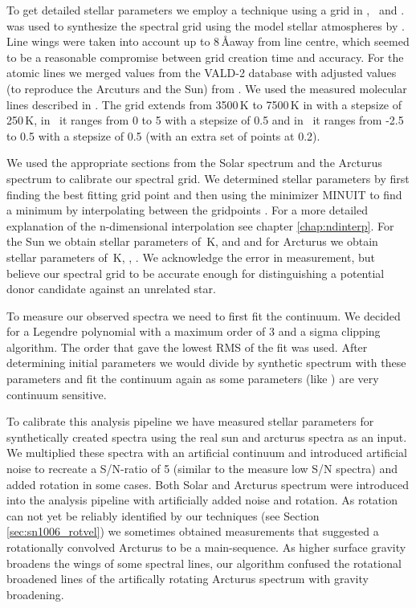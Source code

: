 To get detailed stellar parameters we employ a technique using a grid in \teff, \logg\ and \feh. 
\moog \citep{1973ApJ...184..839S} was used to synthesize the spectral grid using the model stellar atmospheres by \citet{2003IAUS..210P.A20C}. Line wings were taken into account up to 8\,\AA away from line centre, which seemed to be a reasonable compromise between grid creation time and accuracy. For the atomic lines we merged values from the VALD-2 database \citep{2000BaltA...9..590K} with adjusted values (to reproduce the Arcuturs and the Sun) from \cite{2008A&A...486..951G}. We used the measured
molecular lines described in  \citet{1995KurCD..23.....K}. 
The grid extends from 3500\,K to 7500\,K in \teff with a stepsize of 250\,K, in \logg\ it ranges from  0 to 5 with a stepsize of 0.5 and in \feh\ it ranges from -2.5 to 0.5 with a stepsize of 0.5 (with an extra set of points at 0.2). 

We used the appropriate sections from the Solar spectrum \citep{1984sfat.book.....K} and the Arcturus spectrum  \cite{2000vnia.book.....H} to calibrate our spectral grid. We determined stellar parameters by first finding the best fitting grid point and then using the minimizer MINUIT to find a minimum by interpolating between the gridpoints \citep[using][]{Barber96thequickhull}. For a more detailed explanation of the n-dimensional interpolation see chapter \ref{chap:ndinterp}. For the Sun we obtain stellar parameters of \,K,  and  and for Arcturus we obtain stellar parameters of \,K, , . We acknowledge the error in measurement, but believe our spectral grid to be accurate enough for distinguishing a potential donor candidate against an unrelated star. 


To measure our observed spectra we need to first fit the continuum. We decided for a Legendre polynomial with a maximum order of 3 and a sigma clipping algorithm. The order that gave the lowest RMS of the fit was used. After determining initial parameters we would divide by synthetic spectrum with these parameters and fit the continuum again as some parameters (like \feh) are very continuum sensitive.  

To calibrate this analysis pipeline we have measured stellar parameters for synthetically created spectra using the real sun and arcturus spectra as an input. We multiplied these spectra with an artificial continuum and introduced artificial noise to recreate a S/N-ratio of 5 (similar to the measure low S/N spectra) and added rotation in some cases. Both Solar and Arcturus spectrum were introduced into the analysis pipeline with artificially added noise and rotation. As rotation can not yet be reliably identified by our techniques (see Section \ref{sec:sn1006_rotvel}) we sometimes obtained measurements that suggested a rotationally convolved Arcturus to be a main-sequence. As higher surface gravity broadens the wings of some spectral lines, our algorithm confused the rotational broadened lines of the artifically rotating Arcturus spectrum with gravity broadening. 

